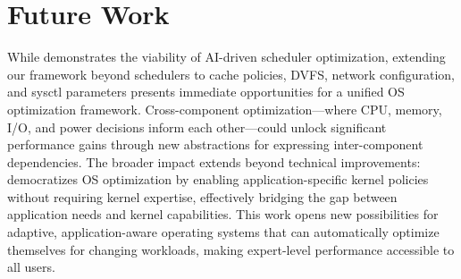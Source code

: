 \section{Future Work}
\label{sec:future}

While \sys demonstrates the viability of AI-driven scheduler optimization, extending our framework beyond schedulers to cache policies, DVFS, network configuration, and sysctl parameters presents immediate opportunities for a unified OS optimization framework. Cross-component optimization—where CPU, memory, I/O, and power decisions inform each other—could unlock significant performance gains through new abstractions for expressing inter-component dependencies. The broader impact extends beyond technical improvements: \sys democratizes OS optimization by enabling application-specific kernel policies without requiring kernel expertise, effectively bridging the gap between application needs and kernel capabilities. This work opens new possibilities for adaptive, application-aware operating systems that can automatically optimize themselves for changing workloads, making expert-level performance accessible to all users.